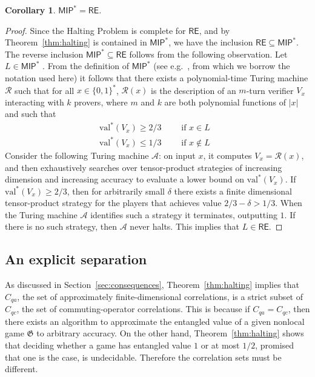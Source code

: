 \documentclass[11pt]{article}
\newtheorem{corollary}[theorem]{Corollary}
\theoremstyle{definition}
\newcommand{\val}{\ensuremath{\mathrm{val}}}
\newcommand{\game}{\mathfrak{G}}
\newcommand{\class}[1]{\ensuremath{\mathsf{#1}}\xspace}
\newcommand{\MIP}{\class{MIP}} %
\renewcommand{\cal}[1]{\mathcal{#1}}
\begin{document}
\begin{corollary}\label{cor:mip-re}
	$\mathsf{MIP}^* = \mathsf{RE}$.
\end{corollary}
\begin{proof}
	Since the Halting Problem is complete for $\mathsf{RE}$, and by
  Theorem~\ref{thm:halting} is contained in $\mathsf{MIP}^*$, we have the
  inclusion $\mathsf{RE} \subseteq \mathsf{MIP}^*$.
  The reverse inclusion $\mathsf{MIP}^* \subseteq \mathsf{RE}$ follows from the
  following observation.
  Let $L \in \mathsf{MIP}^*$ .
  From the definition of $\MIP^*$ (see e.g.~\cite[Section
  6.1]{vidick2016quantum}, from which we borrow the notation used here) it
  follows that there exists a polynomial-time Turing machine $\cal{R}$ such that
  for all $x \in \{0,1\}^*$, $\cal{R}(x)$ is the description of an $m$-turn
  verifier $V_x$ interacting with $k$ provers, where $m$ and $k$ are both
  polynomial functions of $|x|$ and such that
	\begin{gather*}
		\val^*(V_x) \geq 2/3 \qquad \text{ if $x \in L$ } \\
		\val^*(V_x)	\leq 1/3 \qquad \text{ if $x \notin L$ }
	\end{gather*}
	Consider the following Turing machine $\cal{A}$: on input $x$, it computes
  $V_x = \cal{R}(x)$, and then exhaustively searches over tensor-product
  strategies of increasing dimension and increasing accuracy to evaluate a lower
  bound on $\val^*(V_x)$.
  If $\val^*(V_x) \geq 2/3$, then for arbitrarily small $\delta$ there exists a
  finite dimensional tensor-product strategy for the players that achieves value
  $2/3 - \delta > 1/3$.
  When the Turing machine $\cal{A}$ identifies such a strategy it terminates,
  outputting $1$.
  If there is no such strategy, then $\cal{A}$ never halts.
  This implies that $L \in \mathsf{RE}$.
\end{proof}
	
\subsection{An explicit separation}
\label{sec:separation}

As discussed in Section~\ref{sec:consequences}, Theorem~\ref{thm:halting}
implies that $C_{qa}$, the set of approximately finite-dimensional correlations,
is a strict subset of $C_{qc}$, the set of commuting-operator correlations.
This is because if $C_{qa} = C_{qc}$, then there exists an algorithm to
approximate the entangled value of a given nonlocal game $\game$ to arbitrary
accuracy.
On the other hand, Theorem~\ref{thm:halting} shows that deciding whether a game
has entangled value $1$ or at most $1/2$, promised that one is the case, is
undecidable.
Therefore the correlation sets must be different. 
\end{document}
